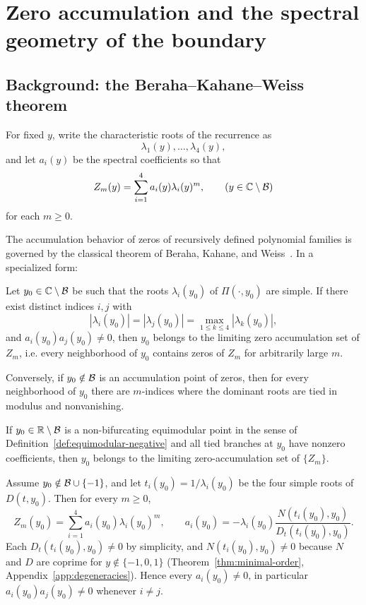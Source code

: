 \section{Zero accumulation and the spectral geometry of the boundary}\label{sec:zeros}

\subsection{Background: the Beraha--Kahane--Weiss theorem}

For fixed \(y\), write the characteristic roots of the recurrence as
\[
\lambda_1(y),\dots,\lambda_4(y),
\]
and let \(a_i(y)\) be the spectral coefficients so that
\[
Z_m(y)=\sum_{i=1}^4 a_i(y)\lambda_i(y)^m,\qquad (y\in\mathbb{C}\setminus\mathcal{B})
\]
for each \(m\ge0\).

The accumulation behavior of zeros of recursively defined polynomial families is governed by the classical theorem of Beraha, Kahane, and Weiss~\cite{BerahaKahaneWeiss1975,BerahaKahaneWeiss1980}.
In a specialized form:

\begin{theorem}\label{thm:bkw}
Let \(y_0\in\mathbb{C}\setminus\mathcal{B}\) be such that the roots \(\lambda_i(y_0)\) of \(\Pi(\cdot,y_0)\) are simple.
If there exist distinct indices \(i,j\) with
\[
\left|\lambda_i(y_0)\right|=\left|\lambda_j(y_0)\right|=\max_{1\le k\le4}\left|\lambda_k(y_0)\right|,
\]
and \(a_i(y_0)a_j(y_0)\neq0\), then \(y_0\) belongs to the limiting zero accumulation set of \(Z_m\), i.e.
every neighborhood of \(y_0\) contains zeros of \(Z_m\) for arbitrarily large \(m\).

Conversely, if \(y_0\notin\mathcal{B}\) is an accumulation point of zeros, then for every neighborhood of \(y_0\) there are \(m\)-indices where the dominant roots are tied in modulus and nonvanishing.
\end{theorem}

\begin{corollary}\label{cor:equimodular-accum}
If \(y_0\in\mathbb{R}\setminus\mathcal{B}\) is a non-bifurcating equimodular point in the sense of Definition~\ref{def:equimodular-negative} and all tied branches at \(y_0\) have nonzero coefficients, then \(y_0\) belongs to the limiting zero-accumulation set of \(\{Z_m\}\).
\end{corollary}

\begin{lemma}\label{lem:coeff-nonzero}
Assume \(y_0\notin\mathcal{B}\cup\{-1\}\), and let \(t_i(y_0)=1/\lambda_i(y_0)\) be the four simple roots of \(D(t,y_0)\).
Then for every \(m\ge0\),
\[
Z_m(y_0)=\sum_{i=1}^4 a_i(y_0)\lambda_i(y_0)^m,
\qquad
a_i(y_0)=-\lambda_i(y_0)\frac{N(t_i(y_0),y_0)}{D_t(t_i(y_0),y_0)}.
\]
Each \(D_t(t_i(y_0),y_0)\neq0\) by simplicity, and \(N(t_i(y_0),y_0)\neq0\) because \(N\) and \(D\) are coprime for \(y\notin\{-1,0,1\}\) (Theorem~\ref{thm:minimal-order}, Appendix~\ref{app:degeneracies}).
Hence every \(a_i(y_0)\neq0\), in particular \(a_i(y_0)a_j(y_0)\neq0\) whenever \(i\neq j\).
\end{lemma}

